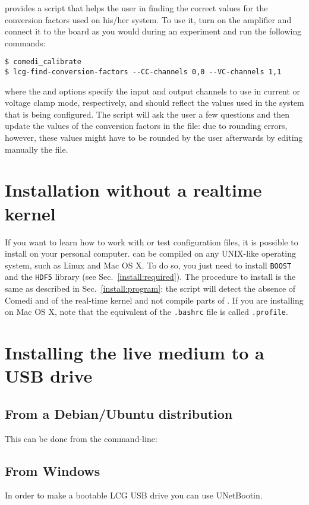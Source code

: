 \progname provides a script that helps the
user in finding the correct values for the conversion factors used on
his/her system. To use it, turn on the amplifier and connect it to the
board as you would during an experiment and run the following commands:
\begin{lstlisting}
$ comedi_calibrate
$ lcg-find-conversion-factors --CC-channels 0,0 --VC-channels 1,1
\end{lstlisting}
where the  and 
options specify the input and output channels to use in current or
voltage clamp mode, respectively, and should reflect the values
used in the system that is being configured.
The script will ask the user a few questions and then update the
values of the conversion factors in the  file:
due to rounding errors, however, these values might have to be rounded
by the user afterwards by editing manually the
 file.

\section{Installation without a realtime kernel}
\label{install:nokernel}
If you want to learn how to work with \progname or test configuration
files, it is possible to install \progname on your personal
computer. \progname can be compiled on any UNIX-like operating system,
such as Linux and Mac OS X. To do so, you just need to install
\texttt{BOOST} and the \texttt{HDF5} library (see
Sec.~\ref{install:required}). The procedure to install \progname is
the same as described in Sec.~\ref{install:program}: the
 script will detect the absence of Comedi and of
the real-time kernel and not compile parts of \progname. If you are
installing \progname on Mac OS X, note that the equivalent of the
\verb+.bashrc+ file is called \verb+.profile+.

\section{Installing the live medium to a USB drive}
\label{note:liveUSB}
\subsection{From a Debian/Ubuntu distribution}
This can be done from the command-line:

\subsection{From Windows}
In order to make a bootable LCG USB drive you can use UNetBootin.

